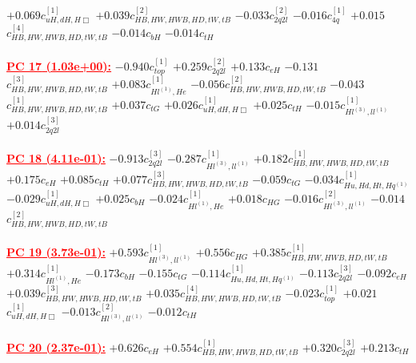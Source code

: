 \documentclass{article}
\begin{document}
{$+0.069$}{\rm $c_{uH,dH,H\Box}^{[1]}$} 
{$+0.039$}{\rm $c_{HB,HW,HWB,HD,tW,tB}^{[2]}$} 
{$-0.033$}{\rm $c_{2q2l}^{[2]}$} 
{$-0.016$}{\rm $c_{4q}^{[1]}$} 
{$+0.015$}{\rm $c_{HB,HW,HWB,HD,tW,tB}^{[4]}$} 
{$-0.014$}{\rm $c_{bH}$} 
{$-0.014$}{\rm $c_{tH}$} 
 \nonumber \\ \nonumber \\ 
\noindent \textcolor{red}{\underline{\bf{PC 17} (1.03e+00):}}
{$-0.940$}{\rm $c_{top}^{[1]}$} 
{$+0.259$}{\rm $c_{2q2l}^{[2]}$} 
{$+0.133$}{\rm $c_{eH}$} 
{$-0.131$}{\rm $c_{HB,HW,HWB,HD,tW,tB}^{[3]}$} 
{$+0.083$}{\rm $c_{Hl^{(1)},He}^{[1]}$} 
{$-0.056$}{\rm $c_{HB,HW,HWB,HD,tW,tB}^{[2]}$} 
{$-0.043$}{\rm $c_{HB,HW,HWB,HD,tW,tB}^{[1]}$} 
{$+0.037$}{\rm $c_{tG}$} 
{$+0.026$}{\rm $c_{uH,dH,H\Box}^{[1]}$} 
{$+0.025$}{\rm $c_{tH}$} 
{$-0.015$}{\rm $c_{Hl^{(3)},ll^{(1)}}^{[1]}$} 
{$+0.014$}{\rm $c_{2q2l}^{[3]}$} 
 \nonumber \\ \nonumber \\ 
\noindent \textcolor{red}{\underline{\bf{PC 18} (4.11e-01):}}
{$-0.913$}{\rm $c_{2q2l}^{[3]}$} 
{$-0.287$}{\rm $c_{Hl^{(3)},ll^{(1)}}^{[1]}$} 
{$+0.182$}{\rm $c_{HB,HW,HWB,HD,tW,tB}^{[1]}$} 
{$+0.175$}{\rm $c_{eH}$} 
{$+0.085$}{\rm $c_{tH}$} 
{$+0.077$}{\rm $c_{HB,HW,HWB,HD,tW,tB}^{[3]}$} 
{$-0.059$}{\rm $c_{tG}$} 
{$-0.034$}{\rm $c_{Hu,Hd,Ht,Hq^{(1)}}^{[1]}$} 
{$-0.029$}{\rm $c_{uH,dH,H\Box}^{[1]}$} 
{$+0.025$}{\rm $c_{bH}$} 
{$-0.024$}{\rm $c_{Hl^{(1)},He}^{[1]}$} 
{$+0.018$}{\rm $c_{HG}$} 
{$-0.016$}{\rm $c_{Hl^{(3)},ll^{(1)}}^{[2]}$} 
{$-0.014$}{\rm $c_{HB,HW,HWB,HD,tW,tB}^{[2]}$} 
 \nonumber \\ \nonumber \\ 
\noindent \textcolor{red}{\underline{\bf{PC 19} (3.73e-01):}}
{$+0.593$}{\rm $c_{Hl^{(3)},ll^{(1)}}^{[1]}$} 
{$+0.556$}{\rm $c_{HG}$} 
{$+0.385$}{\rm $c_{HB,HW,HWB,HD,tW,tB}^{[1]}$} 
{$+0.314$}{\rm $c_{Hl^{(1)},He}^{[1]}$} 
{$-0.173$}{\rm $c_{bH}$} 
{$-0.155$}{\rm $c_{tG}$} 
{$-0.114$}{\rm $c_{Hu,Hd,Ht,Hq^{(1)}}^{[1]}$} 
{$-0.113$}{\rm $c_{2q2l}^{[3]}$} 
{$-0.092$}{\rm $c_{eH}$} 
{$+0.039$}{\rm $c_{HB,HW,HWB,HD,tW,tB}^{[3]}$} 
{$+0.035$}{\rm $c_{HB,HW,HWB,HD,tW,tB}^{[4]}$} 
{$-0.023$}{\rm $c_{top}^{[1]}$} 
{$+0.021$}{\rm $c_{uH,dH,H\Box}^{[1]}$} 
{$-0.013$}{\rm $c_{Hl^{(3)},ll^{(1)}}^{[2]}$} 
{$-0.012$}{\rm $c_{tH}$} 
 \nonumber \\ \nonumber \\ 
\noindent \textcolor{red}{\underline{\bf{PC 20} (2.37e-01):}}
{$+0.626$}{\rm $c_{eH}$} 
{$+0.554$}{\rm $c_{HB,HW,HWB,HD,tW,tB}^{[1]}$} 
{$+0.320$}{\rm $c_{2q2l}^{[3]}$} 
{$+0.213$}{\rm $c_{tH}$} 
\end{document}
